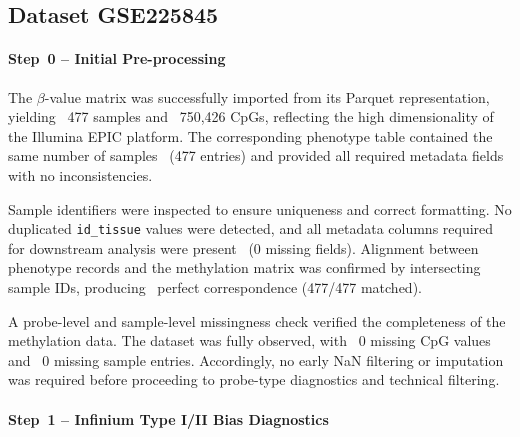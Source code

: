 \documentclass[10pt]{extarticle}
\newcommand{\good}[1]{\textcolor{teal!70!black}{\ding{51}~#1}}
\begin{document}
\subsection{Dataset GSE225845}
\label{subsec:gse225845_preproc}

\paragraph{Step~0 -- Initial Pre-processing}
\label{par:gse225845_step0}

The $\beta$-value matrix was successfully imported from its Parquet representation, yielding 
\good{477 samples} and \good{750{,}426 CpGs}, reflecting the high dimensionality of the Illumina EPIC platform.  
The corresponding phenotype table contained the same number of samples \good{(477 entries)} and provided all required metadata fields with no inconsistencies.

Sample identifiers were inspected to ensure uniqueness and correct formatting. No duplicated \texttt{id\_tissue} values were detected, and all metadata columns required for downstream analysis were present \good{(0 missing fields)}.  
Alignment between phenotype records and the methylation matrix was confirmed by intersecting sample IDs, producing \good{perfect correspondence (477/477 matched)}.

A probe-level and sample-level missingness check verified the completeness of the methylation data.  
The dataset was fully observed, with \good{0 missing CpG values} and \good{0 missing sample entries}.  
Accordingly, no early NaN filtering or imputation was required before proceeding to probe-type diagnostics and technical filtering.


\paragraph{Step~1 -- Infinium Type I/II Bias Diagnostics}
\label{subpar:gse225845_typebias}
\end{document}
